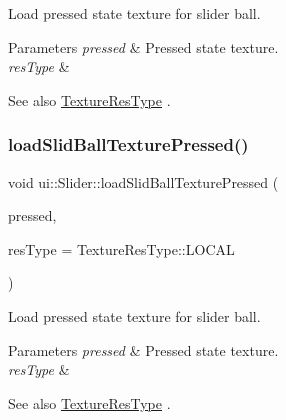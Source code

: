 Load pressed state texture for slider ball.


\begin{DoxyParams}{Parameters}
{\em pressed} & Pressed state texture. \\
\hline
{\em res\+Type} & \\
\hline
\end{DoxyParams}
\begin{DoxySeeAlso}{See also}
\hyperlink{classui_1_1Widget_a040a65ec5ad3b11119b7e16b98bd9af0}{Texture\+Res\+Type} . 
\end{DoxySeeAlso}
\mbox{\label{classui_1_1Slider_a86cb93cd2b0c422864fcdad7a5484825}} 
\subsubsection{\texorpdfstring{load\+Slid\+Ball\+Texture\+Pressed()}{loadSlidBallTexturePressed()}\hspace{0.1cm}{\footnotesize\ttfamily [2/2]}}
{\footnotesize\ttfamily void ui\+::\+Slider\+::load\+Slid\+Ball\+Texture\+Pressed (\begin{DoxyParamCaption}\item[{const std\+::string \&}]{pressed,  }\item[{\hyperlink{classui_1_1Widget_a040a65ec5ad3b11119b7e16b98bd9af0}{Texture\+Res\+Type}}]{res\+Type = {\ttfamily TextureResType\+:\+:LOCAL} }\end{DoxyParamCaption})}

Load pressed state texture for slider ball.


\begin{DoxyParams}{Parameters}
{\em pressed} & Pressed state texture. \\
\hline
{\em res\+Type} & \\
\hline
\end{DoxyParams}
\begin{DoxySeeAlso}{See also}
\hyperlink{classui_1_1Widget_a040a65ec5ad3b11119b7e16b98bd9af0}{Texture\+Res\+Type} . 
\end{DoxySeeAlso}
\mbox{\label{classui_1_1Slider_a8bdbd4777a5635376fd5fe205968c247}} 

